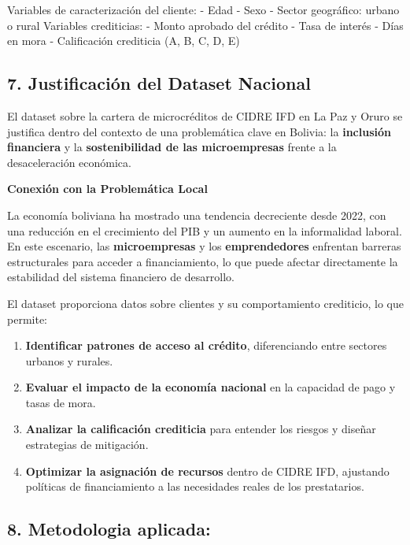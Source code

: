 \documentclass[Royal,times,sageh]{sagej}
\begin{document}
Variables de caracterización del cliente: - Edad - Sexo - Sector
geográfico: urbano o rural Variables crediticias: - Monto aprobado del
crédito - Tasa de interés - Días en mora - Calificación crediticia (A,
B, C, D, E)

\subsection{\texorpdfstring{\textbf{7. Justificación del Dataset
Nacional}}{7. Justificación del Dataset Nacional}}\label{justificaciuxf3n-del-dataset-nacional}

El dataset sobre la cartera de microcréditos de CIDRE IFD en La Paz y
Oruro se justifica dentro del contexto de una problemática clave en
Bolivia: la \textbf{inclusión financiera} y la \textbf{sostenibilidad de
las microempresas} frente a la desaceleración económica.

\textbf{Conexión con la Problemática Local}

La economía boliviana ha mostrado una tendencia decreciente desde 2022,
con una reducción en el crecimiento del PIB y un aumento en la
informalidad laboral. En este escenario, las \textbf{microempresas} y
los \textbf{emprendedores} enfrentan barreras estructurales para acceder
a financiamiento, lo que puede afectar directamente la estabilidad del
sistema financiero de desarrollo.

El dataset proporciona datos sobre clientes y su comportamiento
crediticio, lo que permite:

\begin{enumerate}
\def\labelenumi{\arabic{enumi}.}
\item
  \textbf{Identificar patrones de acceso al crédito}, diferenciando
  entre sectores urbanos y rurales.
\item
  \textbf{Evaluar el impacto de la economía nacional} en la capacidad de
  pago y tasas de mora.
\item
  \textbf{Analizar la calificación crediticia} para entender los riesgos
  y diseñar estrategias de mitigación.
\item
  \textbf{Optimizar la asignación de recursos} dentro de CIDRE IFD,
  ajustando políticas de financiamiento a las necesidades reales de los
  prestatarios.
\end{enumerate}

\subsection{\texorpdfstring{8. \textbf{Metodologia
aplicada:}}{8. Metodologia aplicada:}}\label{metodologia-aplicada}
\end{document}
